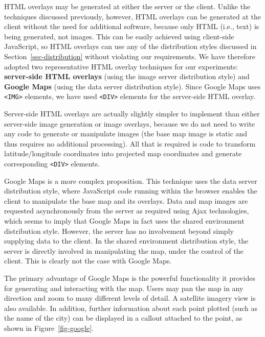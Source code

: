 \documentclass[acmnow]{acmtrans2m}
\begin{document}
HTML overlays may be generated at either the server or the client.
Unlike the techniques discussed previously, however, HTML overlays can
be generated at the client without the need for additional software,
because only HTML (i.e., text) is being generated, not images. This can
be easily achieved using client-side JavaScript, so HTML overlays can
use any of the distribution styles discussed in
Section~\ref{sec-distribution} without violating our requirements. We
have therefore adopted two representative HTML overlay techniques for
our experiments: \textbf{server-side HTML overlays} (using the image
server distribution style) and \textbf{Google Maps} (using the data
server distribution style). Since Google Maps uses \verb|<IMG>|
elements, we have used \verb|<DIV>| elements for the server-side HTML
overlay.

Server-side HTML overlays are actually slightly simpler to implement
than either server-side image generation or image overlays, because we
do not need to write any code to generate or manipulate images (the base
map image is static and thus requires no additional processing). All
that is required is code to transform latitude/longitude coordinates
into projected map coordinates and generate corresponding \verb|<DIV>|
elements.

Google Maps \cite{Goog-M-2006-maps} is a more complex proposition. This
technique uses the data server distribution style, where JavaScript code
running within the browser enables the client to manipulate the base map
and its overlays. Data and map images are requested asynchronously from
the server as required using Ajax technologies, which seems to imply
that Google Maps in fact uses the shared environment distribution style.
However, the server has no involvement beyond simply supplying data to
the client. In the shared environment distribution style, the server is
directly involved in manipulating the map, under the control of the
client. This is clearly not the case with Google Maps.

The primary advantage of Google Maps is the powerful functionality it
provides for generating and interacting with the map. Users may pan the
map in any direction and zoom to many different levels of detail. A
satellite imagery view is also available. In addition, further
information about each point plotted (such as the name of the city) can
be displayed in a callout attached to the point, as shown in
Figure~\ref{fig-google}.
\end{document}

